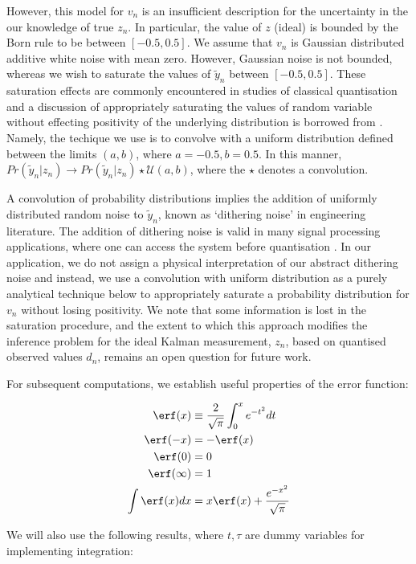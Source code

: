 However, this model for $v_n$ is an insufficient description for  the uncertainty in the our knowledge of true $z_n$. In particular, the value of $z$ (ideal) is bounded by the Born rule to be between $[-0.5, 0.5]$. We assume that $v_n$ is Gaussian distributed additive white noise with mean zero. However, Gaussian noise is not bounded, whereas we wish to saturate the values of $\tilde{y}_n$ between $[-0.5, 0.5]$. These saturation effects are commonly encountered in studies of classical quantisation and a discussion of appropriately saturating the values of random variable without effecting positivity of the underlying distribution is borrowed from \cite{widrow1996}. Namely, the techique we use is to convolve with a uniform distribution defined between the limits $(a,b)$, where $a=-0.5, b=0.5$. In this manner, $Pr( \tilde{y}_n | z_n) \to Pr( \tilde{y}_n | z_n) \star \mathcal{U}(a,b)$, where the $\star$ denotes a convolution. 

A convolution of probability distributions implies the addition of uniformly distributed random noise to $\tilde{y}_n$, known as `dithering noise' in engineering literature. The addition of dithering noise is valid in many signal processing applications, where one can access the system before quantisation \cite{widrow1996,karlsson2005}. In our application, we do not assign a physical interpretation of our abstract dithering noise and instead, we use a convolution with uniform distribution  as a purely analytical technique below to appropriately saturate a probability distribution for $v_n$ without losing positivity.  We note that some information is lost in the saturation procedure, and the extent to which this approach modifies the inference problem for the ideal Kalman measurement, $z_n$, based on quantised observed values $d_n$, remains an open question for future work.  

For subsequent computations, we establish useful properties of the error function:

\begin{align}
\erf(x) & \equiv \frac{2}{\sqrt{\pi}} \int_0^{x} e^{-t^2} dt \\
\erf(-x) & = - \erf(x) \\
\erf(0) & = 0 \\
\erf(\infty) & = 1  \label{sec:app:qkf:errfunc_diverge}\\
\int \erf(x) dx & = x \erf(x) + \frac{e^{-x^2}}{\sqrt{\pi}} 
\end{align}

We will also use the following results, where $t, \tau$ are dummy variables for implementing integration:

